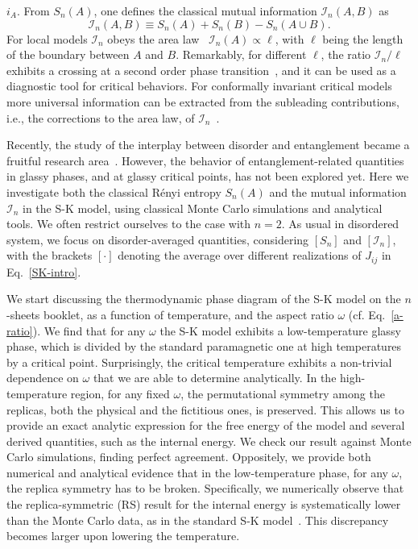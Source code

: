 \documentclass[twocolumn,superscriptaddress,prb,10pt]{revtex4-1}
\begin{document}
$i_A$. From $S_n(A)$, one defines the classical mutual information ${\mathcal I}_n(A,B)$ 
as 
%
\begin{equation}
{\mathcal I}_n(A,B)\equiv S_n(A)+S_n(B)-S_n(A\cup B). 
\end{equation}
%
For local models ${\mathcal I}_n$ obeys the area law~\cite{wolf-2008} ${\mathcal I}_n(A)
\propto\ell$, with $\ell$ being the length of the boundary between $A$ and $B$. Remarkably, 
for different $\ell$, the ratio ${\mathcal I}_n/\ell$ exhibits a crossing at a second 
order phase transition~\cite{jaconis-2013}, and it can be used as a diagnostic tool for 
critical behaviors. For conformally invariant critical models more universal information 
can be extracted from the subleading contributions, i.e., the corrections to the area 
law, of ${\mathcal I}_n$~\cite{stephan-2014}. 


Recently, the study of the interplay between disorder and entanglement became a fruitful 
research area~\cite{refael-2009}. However, the behavior of entanglement-related quantities 
in glassy phases, and at glassy critical points, has not been explored yet. Here we investigate 
both the classical R\'enyi entropy $S_n(A)$ and the mutual information ${\mathcal I}_n$ 
in the S-K model, using classical Monte Carlo simulations and analytical tools. We often 
restrict ourselves to the case with $n=2$. As usual in disordered system, we 
focus on disorder-averaged quantities, considering $[S_n]$ and $[{\mathcal I}_n]$, 
with the brackets $[\cdot]$ denoting the average over different realizations of 
$J_{ij}$ in Eq.~\eqref{SK-intro}.

We start discussing the thermodynamic phase diagram of the S-K model on the $n$-sheets 
booklet, as a function of temperature, and the aspect ratio $\omega$ (cf. Eq.~\eqref{a-ratio}). 
We find that for any $\omega$ the S-K model exhibits a low-temperature glassy phase, which 
is divided by the standard paramagnetic one at high temperatures by a critical point. 
Surprisingly, the critical temperature exhibits a non-trivial dependence on $\omega$ 
that we are able to determine analytically. 
In the high-temperature region, for any fixed $\omega$, the permutational symmetry 
among the replicas, both the physical and the fictitious ones, is preserved. This 
allows us to provide an exact analytic expression for the free energy of the model 
and several derived quantities, such as the internal energy. We check our result 
against Monte Carlo simulations, finding perfect agreement. Oppositely, we provide 
both numerical and analytical evidence that in the low-temperature phase, for any 
$\omega$, the replica symmetry has to be broken. Specifically, we numerically observe 
that the replica-symmetric (RS) result for the internal energy  is systematically 
lower than the Monte Carlo data, as in the standard S-K model~\cite{sherrington-1978-prl,
sherrington-1978}. This discrepancy becomes larger upon lowering the temperature.  
\end{document}
